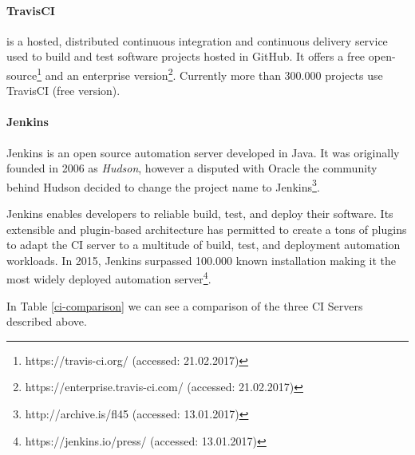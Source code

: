 \paragraph{TravisCI}
is a hosted, distributed continuous integration and continuous delivery service used to build and test software projects hosted in GitHub. It offers a free open-source\footnote{https://travis-ci.org/ (accessed: 21.02.2017)} and an enterprise version\footnote{https://enterprise.travis-ci.com/ (accessed: 21.02.2017)}. Currently more than 300.000 projects use TravisCI (free version).
\paragraph{Jenkins}
Jenkins is an open source automation server developed in Java. It was originally founded in 2006 as \textit{Hudson}, however a disputed with Oracle the community behind Hudson decided to change the project name to Jenkins\footnote{http://archive.is/fl45 (accessed: 13.01.2017)}.

Jenkins enables developers to reliable build, test, and deploy their software. Its extensible and plugin-based architecture has permitted to create a tons of plugins to adapt the CI server to a multitude of build, test, and deployment automation workloads. In 2015, Jenkins surpassed 100.000 known installation making it the most widely deployed automation server\footnote{https://jenkins.io/press/ (accessed: 13.01.2017)}.

In Table \ref{ci-comparison} we can see a comparison of the three CI Servers described above.

